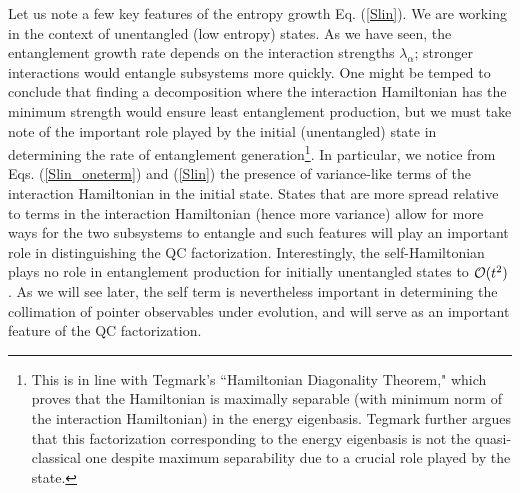 \documentclass[aps,pra,onecolumn,nofootinbib,notitlepage,11pt,tightenlines]{revtex4-1}
\begin{document}
 Let us note a few key features of the entropy growth Eq. (\ref{Slin}). We are working in the context of unentangled (low entropy) states. 
 As we have seen, the entanglement growth rate depends on the interaction strengths $\lambda_{\alpha}$; stronger interactions would entangle subsystems more quickly. One might be temped to conclude that finding a decomposition where the interaction Hamiltonian has the minimum strength would ensure least entanglement production, but we must take note of the important role played by the initial (unentangled) state in determining the rate of entanglement generation\footnote{This is in line with Tegmark's \cite{tegmark2015consciousness} ``Hamiltonian Diagonality Theorem," which proves that the Hamiltonian is maximally separable (with minimum norm of the interaction Hamiltonian) in the energy eigenbasis. Tegmark further argues that this factorization corresponding to the energy eigenbasis is not the quasi-classical one despite maximum separability due to a crucial role played by the state.}.  In particular, we notice from Eqs. (\ref{Slin_oneterm}) and (\ref{Slin}) the presence of variance-like terms of the interaction Hamiltonian in the initial state. States that are more spread relative to terms in the interaction Hamiltonian (hence more variance) allow for more ways for the two subsystems to entangle and such features will play an important role in distinguishing the QC factorization. Interestingly, the self-Hamiltonian plays no role in entanglement production for initially unentangled states to $\mathcal{O}(t^2)$. As we will see later, the self term is nevertheless important in determining the collimation of pointer observables under evolution, and will serve as an important feature of the QC factorization. 
 
\end{document}
